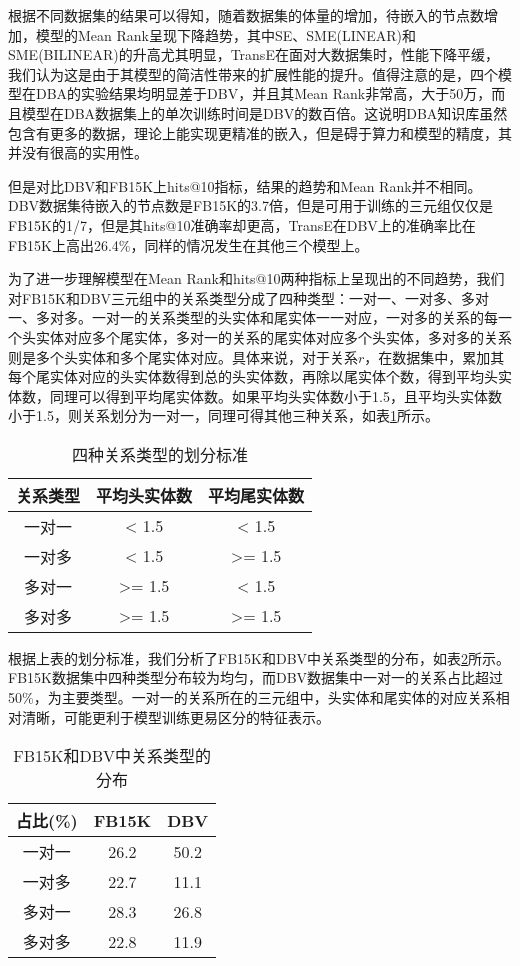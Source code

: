 根据不同数据集的结果可以得知，随着数据集的体量的增加，待嵌入的节点数增加，模型的Mean Rank呈现下降趋势，其中SE、SME(LINEAR)和SME(BILINEAR)的升高尤其明显，TransE在面对大数据集时，性能下降平缓，我们认为这是由于其模型的简洁性带来的扩展性能的提升。值得注意的是，四个模型在DBA的实验结果均明显差于DBV，并且其Mean Rank非常高，大于50万，而且模型在DBA数据集上的单次训练时间是DBV的数百倍。这说明DBA知识库虽然包含有更多的数据，理论上能实现更精准的嵌入，但是碍于算力和模型的精度，其并没有很高的实用性。

但是对比DBV和FB15K上hits@10指标，结果的趋势和Mean Rank并不相同。DBV数据集待嵌入的节点数是FB15K的3.7倍，但是可用于训练的三元组仅仅是FB15K的1/7，但是其hits@10准确率却更高，TransE在DBV上的准确率比在FB15K上高出26.4\%，同样的情况发生在其他三个模型上。

为了进一步理解模型在Mean Rank和hits@10两种指标上呈现出的不同趋势，我们对FB15K和DBV三元组中的关系类型分成了四种类型：一对一、一对多、多对一、多对多。一对一的关系类型的头实体和尾实体一一对应，一对多的关系的每一个头实体对应多个尾实体，多对一的关系的尾实体对应多个头实体，多对多的关系则是多个头实体和多个尾实体对应。具体来说，对于关系$r$，在数据集中，累加其每个尾实体对应的头实体数得到总的头实体数，再除以尾实体个数，得到平均头实体数，同理可以得到平均尾实体数。如果平均头实体数小于1.5，且平均头实体数小于1.5，则关系划分为一对一，同理可得其他三种关系，如表\ref{rel_type}所示。
\begin{table}[H]
\centering
\caption{四种关系类型的划分标准}
\begin{tabular}{ccc}
\toprule
关系类型 & 平均头实体数 & 平均尾实体数 \\
\midrule
一对一 & < 1.5 & < 1.5 \\
一对多 & < 1.5 & >= 1.5 \\
多对一 & >= 1.5 & < 1.5 \\
多对多 & >= 1.5 & >= 1.5 \\
\bottomrule
\end{tabular}
\label{rel_type}
\end{table}

根据上表的划分标准，我们分析了FB15K和DBV中关系类型的分布，如表\ref{rel_dist}所示。FB15K数据集中四种类型分布较为均匀，而DBV数据集中一对一的关系占比超过50\%，为主要类型。一对一的关系所在的三元组中，头实体和尾实体的对应关系相对清晰，可能更利于模型训练更易区分的特征表示。
\begin{table}[H]
\centering
\caption{FB15K和DBV中关系类型的分布}
\begin{tabular}{ccc}
\toprule
占比(\%) & FB15K & DBV \\
\midrule
一对一 & 26.2 & 50.2 \\
一对多 & 22.7 & 11.1 \\
多对一 & 28.3 & 26.8 \\
多对多 & 22.8 & 11.9 \\
\bottomrule
\end{tabular}
\label{rel_dist}
\end{table}

